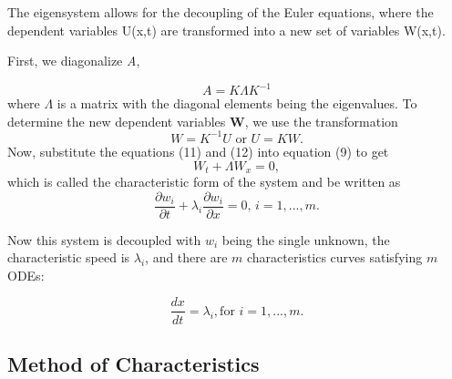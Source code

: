 \documentclass[]{article}
\begin{document}
	The eigensystem allows for the decoupling of the Euler equations, where the dependent variables U(x,t) are transformed into a new set of variables W(x,t). 
	
	First, we diagonalize \textit{A},
	
	\begin{equation}
		A = K \Lambda K^{-1}
	\end{equation}
	where $\Lambda$ is a matrix with the diagonal elements being the eigenvalues. To determine the new dependent variables \textbf{W}, we use the transformation
	\begin{equation}
		W = K^{-1} U  \mbox{ or }  U = KW.
	\end{equation}
	Now, substitute the equations (11) and (12) into equation (9) to get
	\begin{equation}
		W_t + \Lambda W_x = 0,
	\end{equation}
	which is called the characteristic form of the system and be written as 
	\begin{equation}
		\frac{\partial w_i}{\partial t} + \lambda_i \frac{\partial w_i}{\partial x} = 0 \mbox{,    } i = 1,...,m.
	\end{equation}

	Now this system is decoupled with $w_i$ being the single unknown, the characteristic speed is $\lambda_i$, and there are $ m $ characteristics curves satisfying $m$ ODEs:
	
	\begin{equation}
		\frac{dx}{dt} = \lambda_i, \mbox{for } i = 1,...,m.
	\end{equation}
	
	\subsection{Method of Characteristics}
	
\end{document}
